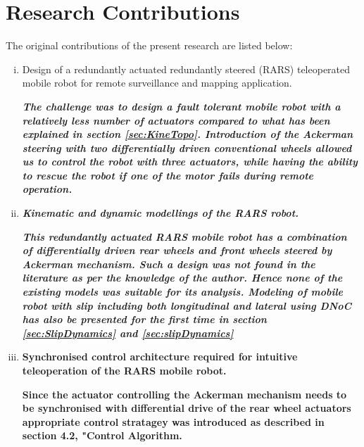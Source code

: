 \section{Research Contributions}
The original contributions of the present research are listed below:
\begin{enumerate}[(i)]

\item Design of a redundantly actuated redundantly steered (RARS)  teleoperated mobile robot for remote surveillance and mapping application.

 \textbf{\textit{The challenge was to design a fault tolerant mobile robot with a relatively less number of actuators compared to what has been explained in section \ref{sec:KineTopo}. Introduction of the Ackerman steering with two differentially  driven  conventional wheels allowed us to control the robot with three actuators, while having the ability to rescue the robot if one of the motor fails during remote operation.} }
		
 
	
\item \textbf{\textit{ Kinematic and dynamic modellings of the RARS robot.}}


		 \textbf{\textit{This redundantly actuated RARS mobile robot  has a combination of differentially driven rear wheels and front wheels steered by  Ackerman mechanism. Such a design was not found in the literature as per the knowledge of the author. Hence none of the existing models was suitable for its analysis. Modeling of mobile robot with slip including both longitudinal and lateral using DNoC has also be presented for the first time in section \ref{sec:SlipDynamics}    and \ref{sec:slipDynamics}  }} 
		
%	
	   
\item \textbf{Synchronised control architecture required for intuitive teleoperation of the RARS mobile robot.} 

\textbf{Since the actuator controlling the Ackerman mechanism needs to be synchronised with differential drive of the rear wheel actuators appropriate control stratagey was introduced as described in section 4.2, "Control Algorithm.}



\end{enumerate}
